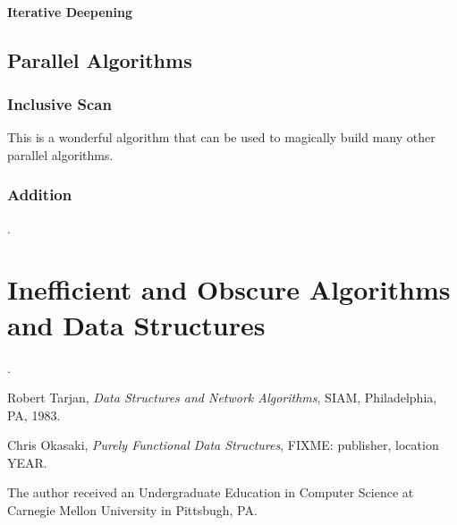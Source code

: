 \documentclass[12pt, letterpaper]{book}
\begin{document}
		\subsection{Iterative Deepening}

	\chapter{Parallel Algorithms}

	\section{Inclusive Scan}

This is a wonderful algorithm that can be used to magically build many other parallel algorithms.

	\section{Addition}.

\part{Inefficient and Obscure Algorithms and Data Structures}

.



\begin{thebibliography}{9}

  Robert Tarjan,
  \emph{Data Structures and Network Algorithms},
  SIAM, Philadelphia, PA,
  1983.

  Chris Okasaki,
  \emph{Purely Functional Data Structures},
  FIXME: publisher, location
  YEAR.

	The author received an Undergraduate Education in Computer Science at Carnegie Mellon University in Pittsbugh, PA.

\end{thebibliography}



\end{document}
